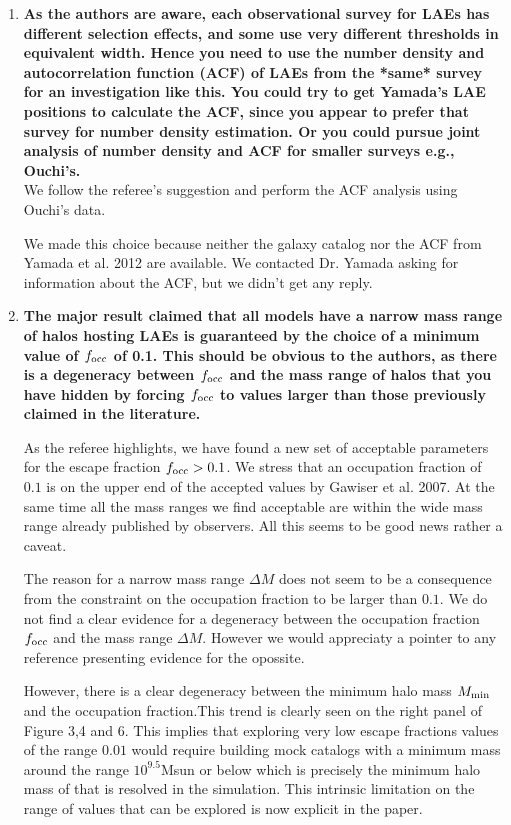 \documentclass[12pts]{article}
\begin{document}
\begin{enumerate}
\item {\bf As the authors are aware, each observational survey for LAEs has
  different selection effects, and some use very different thresholds
  in equivalent width.  Hence you need to use the number density and
  autocorrelation function (ACF) of LAEs from the *same* survey for an
  investigation like this.  You could try to get Yamada's LAE
  positions to calculate the ACF, since you appear to prefer that
  survey for number density estimation.  Or you could pursue joint
  analysis of number density and ACF for smaller surveys e.g.,
  Ouchi's. }\\


  We follow the referee's suggestion and perform the ACF analysis
  using Ouchi's data.

  We made this choice because neither the galaxy catalog
  nor the ACF from Yamada et al. 2012 are available. We contacted
  Dr. Yamada asking for information about the ACF, but we didn't get
  any reply.  

\item {\bf 
  The major result claimed that all models have a narrow mass range
  of halos hosting LAEs is guaranteed by the choice of a minimum
  value of $f_{\rm occ}$ of 0.1.  This should be obvious to the authors, as
  there is a degeneracy between $f_{\rm occ}$ and the mass range of halos
  that you have hidden by forcing $f_{\rm occ}$ to values larger than those
  previously claimed in the literature. }

  As the referee highlights, we have found a new set of acceptable
  parameters for the escape fraction $f_{\rm occ}>0.1$. We stress that
  an occupation fraction of $0.1$ is on the upper end of the accepted
  values by Gawiser et al. 2007. At the same time all the mass ranges
  we find acceptable are within the wide mass range already published
  by observers. All this seems to be good news rather a caveat.

  The reason for a narrow mass range $\Delta M$ does not
  seem to be a consequence from the constraint on the occupation
  fraction to be larger than $0.1$. We do not find a clear evidence
  for a degeneracy between the occupation fraction $f_{\rm occ}$ and
  the mass range $\Delta M$. However we would appreciaty a pointer to
  any reference presenting evidence for the opossite.

  However, there is a clear degeneracy between the minimum halo mass
  $M_{\rm min}$ and the occupation fraction.This trend is clearly
  seen on the right panel of Figure 3,4 and 6. This implies that
  exploring very low escape fractions values of the range $0.01$ would
  require building mock catalogs with a minimum mass around the range
  $10^{9.5}$Msun or below which is precisely the minimum halo mass of
  that is resolved in the simulation. This intrinsic limitation on the
  range of values that can be explored is now explicit in the paper. 


\end{enumerate}
\end{document}
